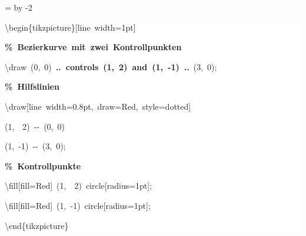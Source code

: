 \begingroup
\ttfamily
{}
=\textwidth
\advance{} by -2\fboxsep
\noindent
\colorbox{background}
{%
\parbox{\dimen255}
{%
\rule[-0.5ex]{0pt}{2.5ex}\hspace*{0.0em}\textbackslash{}begin\{tikzpicture\}[line~width=1pt]\\
\rule[-0.5ex]{0pt}{2.5ex}\hspace*{1.0em}\textcolor{G}{\textbf{\%~Bezierkurve~mit~zwei~Kontrollpunkten}}\\
\rule[-0.5ex]{0pt}{2.5ex}\hspace*{1.0em}\textbackslash{}draw~(0,~0)~\textcolor{R}{\textbf{..~controls~(1,~2)~and~(1,~{-}1)~..}}~(3,~0);\\
\rule[-0.5ex]{0pt}{2.5ex}\hspace*{1.0em}\textcolor{G}{\textbf{\%~Hilfslinien}}\\
\rule[-0.5ex]{0pt}{2.5ex}\hspace*{1.0em}\textbackslash{}draw[line~width=0.8pt,~draw=Red,~style=dotted]\\
\rule[-0.5ex]{0pt}{2.5ex}\hspace*{3.5em}(1,~~2)~{-}{-}~(0,~0)\\
\rule[-0.5ex]{0pt}{2.5ex}\hspace*{3.5em}(1,~{-}1)~{-}{-}~(3,~0);\\
\rule[-0.5ex]{0pt}{2.5ex}\hspace*{1.0em}\textcolor{G}{\textbf{\%~Kontrollpunkte}}\\
\rule[-0.5ex]{0pt}{2.5ex}\hspace*{1.0em}\textbackslash{}fill[fill=Red]~(1,~~2)~circle[radius=1pt];\\
\rule[-0.5ex]{0pt}{2.5ex}\hspace*{1.0em}\textbackslash{}fill[fill=Red]~(1,~{-}1)~circle[radius=1pt];\\
\rule[-0.5ex]{0pt}{2.5ex}\hspace*{0.0em}\textbackslash{}end\{tikzpicture\}}%
}%
\endgroup
